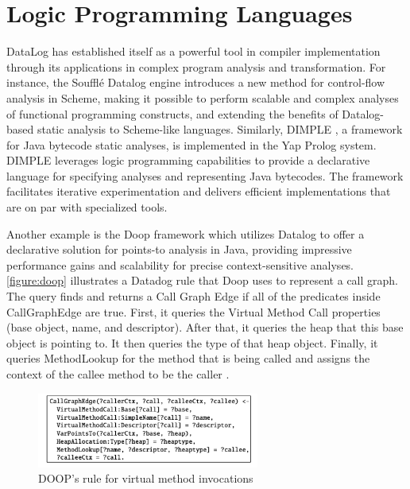 \section{Logic Programming Languages}
DataLog has established itself as a powerful tool in compiler implementation through its applications in complex program analysis and transformation. For instance, the Soufflé Datalog engine \cite{silverman2021wantanalyzeschemeprograms} introduces a new method for control-flow analysis in Scheme, making it possible to perform scalable and complex analyses of functional programming constructs, and extending the benefits of Datalog-based static analysis to Scheme-like languages. Similarly, DIMPLE \cite{Benton2007}, a framework for Java bytecode static analyses, is implemented in the Yap Prolog system. DIMPLE leverages logic programming capabilities to provide a declarative language for specifying analyses and representing Java bytecodes. The framework facilitates iterative experimentation and delivers efficient implementations that are on par with specialized tools. 

Another example is the Doop framework \cite{Bravenboer2009} which utilizes Datalog to offer a declarative solution for points-to analysis in Java, providing impressive performance gains and scalability for precise context-sensitive analyses. \autoref{figure:doop} illustrates a Datadog rule that Doop uses to represent a call graph. The query finds and returns a Call Graph Edge if all of the predicates inside CallGraphEdge are true. First, it queries the Virtual Method Call properties (base object, name, and descriptor). After that, it queries the heap that this base object is pointing to. It then queries the type of that heap object. Finally, it queries MethodLookup for the method that is being called and assigns the context of the callee method to be the caller \cite{Bravenboer2009}.

\begin{figure}[h]
    \centering
    \includegraphics[width=0.65\textwidth]{Packages/Doop.png}
    \caption{DOOP's rule for virtual method invocations \cite{Bravenboer2009}}
    \label{figure:doop}
\end{figure}

